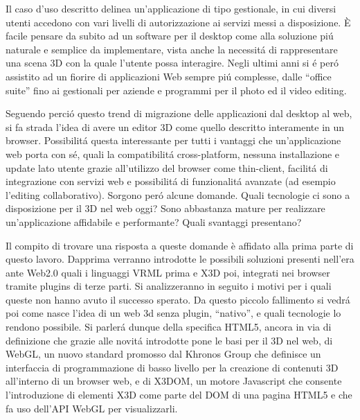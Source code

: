 
Il caso d'uso descritto delinea un'applicazione di tipo gestionale, in cui diversi utenti accedono con vari livelli di autorizzazione ai servizi messi a disposizione. \`{E} facile pensare da subito ad un software per il desktop come alla soluzione pi\'{u} naturale e semplice da implementare, vista anche la necessit\'{a} di rappresentare una scena 3D con la quale l'utente possa interagire. Negli ultimi anni si \'{e} per\'{o} assistito ad un fiorire di applicazioni Web  sempre pi\'{u} complesse, dalle ``office suite'' fino ai gestionali per aziende e programmi per il photo ed il video editing.

Seguendo perci\'{o} questo trend di migrazione delle applicazioni dal desktop al web, si fa strada l'idea di avere un editor 3D come quello descritto interamente in un browser. Possibilit\'{a} questa interessante per tutti i vantaggi che un'applicazione web porta con s\'{e}, quali la compatibilit\'{a} cross-platform, nessuna installazione e update lato utente grazie all'utilizzo del browser come thin-client, facilit\'{a} di integrazione con servizi web e possibilit\'{a} di funzionalit\'{a} avanzate (ad esempio l'editing collaborativo). Sorgono per\'{o} alcune domande. Quali tecnologie ci sono a disposizione per il 3D nel web oggi? Sono abbastanza mature per realizzare un'applicazione affidabile e performante? Quali svantaggi presentano? 

Il compito di trovare una risposta a queste domande \`{e} affidato alla prima parte di questo lavoro. Dapprima verranno introdotte le possibili soluzioni presenti nell'era ante Web2.0 quali i linguaggi VRML prima e X3D poi, integrati nei browser tramite plugins di terze parti. Si analizzeranno in seguito i motivi per i quali queste non hanno avuto il successo sperato. Da questo piccolo fallimento si vedr\'{a} poi come nasce l'idea di un web 3d senza plugin, ``nativo'', e quali tecnologie lo rendono possibile. Si parler\'{a} dunque della specifica HTML5, ancora in via di definizione che grazie alle novit\'{a} introdotte pone le basi per il 3D nel web, di WebGL, un nuovo standard promosso dal Khronos Group che definisce un interfaccia di programmazione di basso livello per la creazione di contenuti 3D all'interno di un browser web, e di X3DOM, un motore Javascript che consente l'introduzione di elementi X3D come parte del DOM di una pagina HTML5 e che fa uso dell'API WebGL per visualizzarli.

